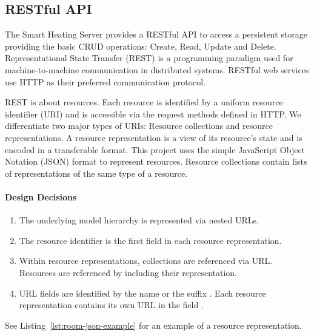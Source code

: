 \subsection{RESTful API}

The Smart Heating Server provides a RESTful API to access a persistent storage providing the basic CRUD operations: Create, Read, Update and Delete.
Representational State Transfer (REST) is a programming paradigm used for machine-to-machine communication in distributed systems.
RESTful web services use HTTP as their preferred communication protocol.

REST is about resources.
Each resource is identified by a uniform resource identifier (URI) and is accessible via the request methods defined in HTTP.
We differentiate two major types of URIs: Resource collections and resource representations.
A resource representation is a view of its resource's state and is encoded in a transferable format.
This project uses the simple JavaScript Object Notation (JSON) format to represent resources.
Resource collections contain lists of representations of the same type of a resource.

\paragraph{Design Decisions}

\begin{enumerate}
    \itemsep0em
    \item The underlying model hierarchy is represented via nested URLs.
    \label{enum:design_decision_nested_urls}
    
    \item The resource identifier is the first field in each resource representation.
    \label{enum:design_decision_identifier_first_field}
    
    \item Within resource representations, collections are referenced via URL. Resources are referenced by including their representation.
    \label{enum:design_decision_resource_referencing}
    
    \item URL fields are identified by the name  or the suffix . Each resource representation contains its own URL in the field .
    \label{enum:design_decision_url_fields_prefix}
\end{enumerate}

See Listing~\ref{lst:room-json-example} for an example of a resource representation.

